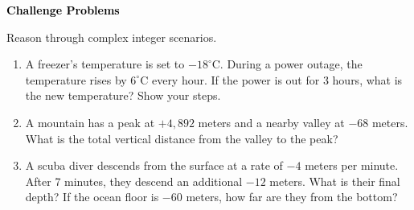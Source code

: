 \documentclass[12pt, letterpaper, fleqn]{article}
\begin{document}
\begin{tcolorbox}[colback=black!10]
\large\textcolor{black}{\textbf{Challenge Problems}}
\end{tcolorbox}

\noindent
Reason through complex integer scenarios.

\vspace{3mm}
\begin{enumerate}[itemsep=2.4cm, leftmargin=0.6cm]
\item A freezer's temperature is set to $-18^\circ\text{C}$. During a power outage, the temperature rises by $6^\circ\text{C}$ every hour. If the power is out for 3 hours, what is the new temperature? Show your steps.

\vspace{2.3cm}

\item A mountain has a peak at $+4,892$ meters and a nearby valley at $-68$ meters. What is the total vertical distance from the valley to the peak?

\vspace{2.3cm}

\item A scuba diver descends from the surface at a rate of $-4$ meters per minute. After 7 minutes, they descend an additional $-12$ meters. What is their final depth? If the ocean floor is $-60$ meters, how far are they from the bottom?

\vspace{2.5cm}

\end{enumerate}
\end{document}
